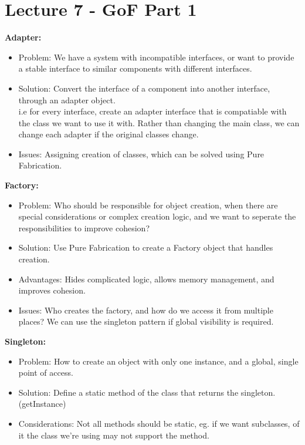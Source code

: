 \documentclass[a4paper,10pt]{article}
\begin{document}
\section*{Lecture 7 - GoF Part 1}
\textcolor{Periwinkle}{\textbf{Adapter:}}
\renewcommand{\labelitemi}{\textperiodcentered}
\begin{itemize}
\item\textcolor{Periwinkle}{Problem:} We have a system with incompatible interfaces, or want to provide a stable interface to similar components with different interfaces. 
\item\textcolor{Periwinkle}{Solution:} Convert the interface of a component into another interface, through an adapter object. \\ 
i.e for every interface, create an adapter interface that is compatiable with the class we want to use it with. Rather than changing the main class, we can change each adapter if the original classes change. 
\item\textcolor{Periwinkle}{Issues:} Assigning creation of classes, which can be solved using Pure Fabrication. 
\end{itemize}
\textcolor{Periwinkle}{\textbf{Factory:}}
\renewcommand{\labelitemi}{\textperiodcentered}
\begin{itemize}
\item\textcolor{Periwinkle}{Problem:} Who should be responsible for object creation, when there are special considerations or complex creation logic, and we want to seperate the responsibilities to improve cohesion? 
\item\textcolor{Periwinkle}{Solution:} Use Pure Fabrication to create a Factory object that handles creation.
\item\textcolor{Periwinkle}{Advantages:} Hides complicated logic, allows memory management, and improves cohesion.
\item\textcolor{Periwinkle}{Issues:} Who creates the factory, and how do we access it from multiple places? We can use the singleton pattern if global visibility is required. 
\end{itemize}
\textcolor{Periwinkle}{\textbf{Singleton:}}
\renewcommand{\labelitemi}{\textperiodcentered}
\begin{itemize}
\item\textcolor{Periwinkle}{Problem:} How to create an object with only one instance, and a global, single point of access. 
\item\textcolor{Periwinkle}{Solution:} Define a static method of the class that returns the singleton. (getInstance)
\item\textcolor{Periwinkle}{Considerations:} Not all methods should be static, eg. if we want subclasses, of it the class we're using may not support the method. 
\end{itemize}
\end{document}
